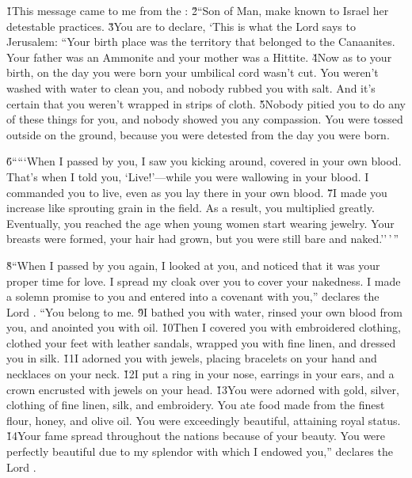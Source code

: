 \v{1}This message came to me from the : \v{2}``Son of Man, make known to Israel her detestable practices. \v{3}You are to declare, `This is what the Lord  says to Jerusalem: ``Your birth place was the territory that belonged to the Canaanites. Your father was an Ammonite and your mother was a Hittite. \v{4}Now as to your birth, on the day you were born your umbilical cord wasn't cut. You weren't washed with water to clean you, and nobody rubbed you with salt. And it's certain that you weren't wrapped in strips of cloth. \v{5}Nobody pitied you to do any of these things for you, and nobody showed you any compassion. You were tossed outside on the ground, because you were detested from the day you were born.

\v{6}`````When I passed by you, I saw you kicking around, covered in your own blood. That's when I told you, `Live!'---while you were wallowing in your blood. I commanded you to live, even as you lay there in your own blood. \v{7}I made you increase like sprouting grain in the field. As a result, you multiplied greatly. Eventually, you reached the age when young women start wearing jewelry. Your breasts were formed, your hair had grown, but you were still bare and naked.''\,'\,''

\v{8}``When I passed by you again, I looked at you, and noticed that it was your proper time for love. I spread my cloak over you to cover your nakedness. I made a solemn promise to you and entered into a covenant with you,'' declares the Lord . ``You belong to me. \v{9}I bathed you with water, rinsed your own blood from you, and anointed you with oil. \v{10}Then I covered you with embroidered clothing, clothed your feet with leather sandals, wrapped you with fine linen, and dressed you in silk. \v{11}I adorned you with jewels, placing bracelets on your hand and necklaces on your neck. \v{12}I put a ring in your nose, earrings in your ears, and a crown encrusted with jewels on your head. \v{13}You were adorned with gold, silver, clothing of fine linen, silk, and embroidery. You ate food made from the finest flour, honey, and olive oil. You were exceedingly beautiful, attaining royal status. \v{14}Your fame spread throughout the nations because of your beauty. You were perfectly beautiful due to my splendor with which I endowed you,'' declares the Lord .

